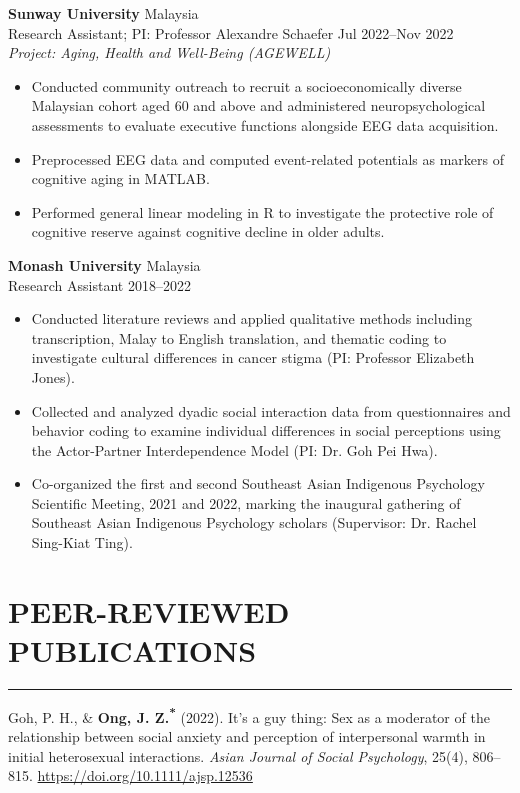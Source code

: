 \documentclass[11pt]{article}
\begin{document}
\textbf{Sunway University} \hfill Malaysia \\
Research Assistant; PI: Professor Alexandre Schaefer \hfill Jul 2022--Nov 2022\\
\textit{Project: Aging, Health and Well-Being (AGEWELL)}
\begin{itemize}[leftmargin=1.2cm]
    \item Conducted community outreach to recruit a socioeconomically diverse Malaysian cohort aged 60 and above and administered neuropsychological assessments to evaluate executive functions alongside EEG data acquisition.
    \item Preprocessed EEG data and computed event-related potentials as markers of cognitive aging in MATLAB.
    \item Performed general linear modeling in R to investigate the protective role of cognitive reserve against cognitive decline in older adults.
\end{itemize}

\textbf{Monash University} \hfill Malaysia \\
Research Assistant \hfill 2018--2022
\begin{itemize}[leftmargin=1.2cm]
    \item Conducted literature reviews and applied qualitative methods including transcription, Malay to English translation, and thematic coding to investigate cultural differences in cancer stigma (PI: Professor Elizabeth Jones).
    \item Collected and analyzed dyadic social interaction data from questionnaires and behavior coding to examine individual differences in social perceptions using the Actor-Partner Interdependence Model (PI: Dr. Goh Pei Hwa).
    \item Co-organized the first and second Southeast Asian Indigenous Psychology Scientific Meeting, 2021 and 2022, marking the inaugural gathering of Southeast Asian Indigenous Psychology scholars (Supervisor: Dr. Rachel Sing-Kiat Ting).
\end{itemize}

\section*{PEER-REVIEWED PUBLICATIONS}
\hrule
Goh, P. H., \& \textbf{Ong, J. Z.\textsuperscript{*}} (2022). It's a guy thing: Sex as a moderator of the relationship between social anxiety and perception of interpersonal warmth in initial heterosexual interactions. \textit{Asian Journal of Social Psychology}, 25(4), 806–815. \href{https://doi.org/10.1111/ajsp.12536}{https://doi.org/10.1111/ajsp.12536}
\end{document}
